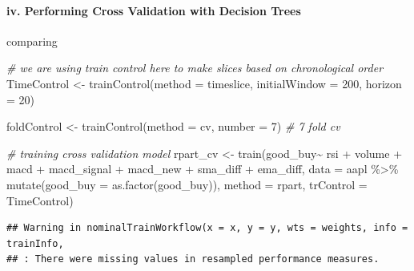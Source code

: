 \documentclass[
]{article}
\newenvironment{Shaded}{\begin{snugshade}}{\end{snugshade}}
\newcommand{\AttributeTok}[1]{\textcolor[rgb]{0.77,0.63,0.00}{#1}}
\newcommand{\CommentTok}[1]{\textcolor[rgb]{0.56,0.35,0.01}{\textit{#1}}}
\newcommand{\DecValTok}[1]{\textcolor[rgb]{0.00,0.00,0.81}{#1}}
\newcommand{\FunctionTok}[1]{\textcolor[rgb]{0.00,0.00,0.00}{#1}}
\newcommand{\NormalTok}[1]{#1}
\newcommand{\OtherTok}[1]{\textcolor[rgb]{0.56,0.35,0.01}{#1}}
\newcommand{\SpecialCharTok}[1]{\textcolor[rgb]{0.00,0.00,0.00}{#1}}
\newcommand{\StringTok}[1]{\textcolor[rgb]{0.31,0.60,0.02}{#1}}
\begin{document}
\hypertarget{iv.-performing-cross-validation-with-decision-trees}{%
\paragraph{iv. Performing Cross Validation with Decision
Trees}\label{iv.-performing-cross-validation-with-decision-trees}}

comparing

\begin{Shaded}
\begin{Highlighting}[]
\CommentTok{\# we are using train control here to make slices based on chronological order}
\NormalTok{TimeControl }\OtherTok{\textless{}{-}} \FunctionTok{trainControl}\NormalTok{(}\AttributeTok{method =} \StringTok{\textquotesingle{}timeslice\textquotesingle{}}\NormalTok{,}
                            \AttributeTok{initialWindow =} \DecValTok{200}\NormalTok{,}
                            \AttributeTok{horizon =} \DecValTok{20}\NormalTok{)}

\NormalTok{foldControl }\OtherTok{\textless{}{-}} \FunctionTok{trainControl}\NormalTok{(}\AttributeTok{method =} \StringTok{\textquotesingle{}cv\textquotesingle{}}\NormalTok{, }\AttributeTok{number =} \DecValTok{7}\NormalTok{) }\CommentTok{\# 7 fold cv}


\CommentTok{\# training cross validation model}
\NormalTok{rpart\_cv }\OtherTok{\textless{}{-}} \FunctionTok{train}\NormalTok{(good\_buy}\SpecialCharTok{\textasciitilde{}}\NormalTok{ rsi }\SpecialCharTok{+}\NormalTok{ volume }\SpecialCharTok{+}\NormalTok{ macd }\SpecialCharTok{+}\NormalTok{ macd\_signal }\SpecialCharTok{+}\NormalTok{ macd\_new }\SpecialCharTok{+}\NormalTok{ sma\_diff }\SpecialCharTok{+}\NormalTok{ ema\_diff, }\AttributeTok{data =}\NormalTok{ aapl }\SpecialCharTok{\%\textgreater{}\%} \FunctionTok{mutate}\NormalTok{(}\AttributeTok{good\_buy =} \FunctionTok{as.factor}\NormalTok{(good\_buy)), }\AttributeTok{method =} \StringTok{\textquotesingle{}rpart\textquotesingle{}}\NormalTok{, }\AttributeTok{trControl =}\NormalTok{ TimeControl)}
\end{Highlighting}
\end{Shaded}

\begin{verbatim}
## Warning in nominalTrainWorkflow(x = x, y = y, wts = weights, info = trainInfo,
## : There were missing values in resampled performance measures.
\end{verbatim}
\end{document}
